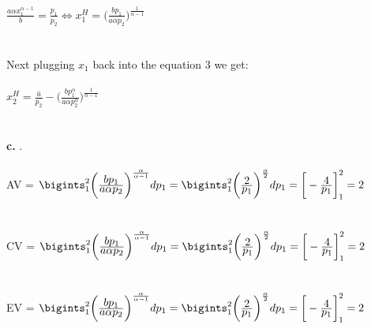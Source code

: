 \documentclass[12pt]{article}
\newenvironment{problem}[2][Problem]{\begin{trivlist}
\item[\hskip \labelsep {\bfseries #1}\hskip \labelsep {\bfseries #2.}]}{\end{trivlist}}
\newcommand\ddfrac[2]{\frac{\displaystyle #1}{\displaystyle #2}}
\begin{document}
\begin{problem}{3}
\\
$\ddfrac{a \alpha x_1^{\alpha - 1}}{ b } = \ddfrac{ p_1}{ p_2} \iff  x_1^H = \bigg(\ddfrac{bp_1}{ a \alpha p_2}\bigg)^{\frac{1}{\alpha - 1}}$
\\
\\
\\
Next plugging $x_1 $ back into the equation 3 we get:
\\
\\
$x_2^H  =\frac{\bar{u}}{p_2} - \bigg(\ddfrac{bp_1^\alpha}{ a \alpha p_2^\alpha}\bigg)^{\frac{1}{\alpha - 1}}$
\\
\\
\\
\textbf{c.} .\\ 
\\
AV = $ \bigints_{1}^2 \bigg(\ddfrac{bp_1}{ a \alpha p_2}\bigg)^{\frac{\alpha }{\alpha - 1}} dp_1 = \bigints_{1}^2 \bigg(\ddfrac{2}{  p_1}\bigg)^{\frac{\alpha }{2}} dp_1  = \bigg[ -\ddfrac{4}{p_1} \bigg]_1^2 = 2$ 
\\
\\
\\
CV = $ \bigints_{1}^2 \bigg(\ddfrac{bp_1}{ a \alpha p_2}\bigg)^{\frac{\alpha }{\alpha - 1}} dp_1 = \bigints_{1}^2 \bigg(\ddfrac{2}{  p_1}\bigg)^{\frac{\alpha }{2}} dp_1  = \bigg[ -\ddfrac{4}{p_1} \bigg]_1^2 = 2$ 
\\
\\
\\
EV = $ \bigints_{1}^2 \bigg(\ddfrac{bp_1}{ a \alpha p_2}\bigg)^{\frac{\alpha }{\alpha - 1}} dp_1 = \bigints_{1}^2 \bigg(\ddfrac{2}{  p_1}\bigg)^{\frac{\alpha }{2}} dp_1  = \bigg[ -\ddfrac{4}{p_1} \bigg]_1^2 = 2$ 
\\
\\
\end{problem}
\pagebreak
\end{document}
